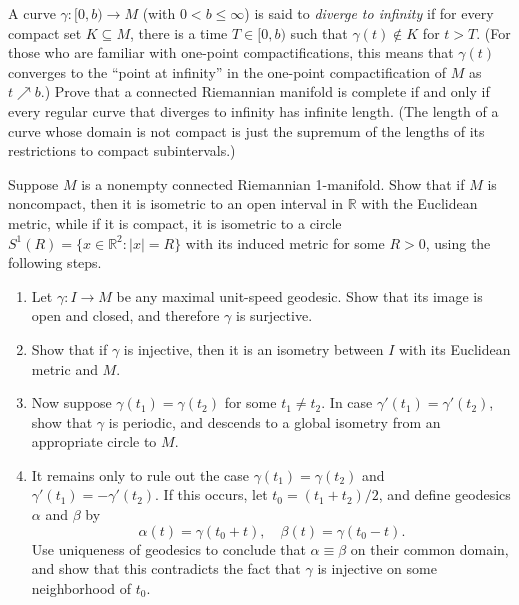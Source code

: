 \begin{exercise}
\label{prob:completeness-divergence}

A curve $\gamma : [0, b) \to M$ (with $0 < b \leq \infty$) is said to \emph{diverge to infinity} if for every compact set $K \subseteq M$, there is a time $T \in [0, b)$ such that $\gamma(t) \notin K$ for $t > T$. (For those who are familiar with one-point compactifications, this means that $\gamma(t)$ converges to the ``point at infinity'' in the one-point compactification of $M$ as $t \nearrow b$.) Prove that a connected Riemannian manifold is complete if and only if every regular curve that diverges to infinity has infinite length. (The length of a curve whose domain is not compact is just the supremum of the lengths of its restrictions to compact subintervals.)
\end{exercise}

\begin{exercise}
\label{prob:connected-riemannian-1-manifold-structure}

Suppose $M$ is a nonempty connected Riemannian 1-manifold. Show that if $M$ is noncompact, then it is isometric to an open interval in $\mathbb{R}$ with the Euclidean metric, while if it is compact, it is isometric to a circle $S^1(R) = \{x \in \mathbb{R}^2 : |x| = R\}$ with its induced metric for some $R > 0$, using the following steps.
\begin{enumerate}
\item[(a)] Let $\gamma : I \to M$ be any maximal unit-speed geodesic. Show that its image is open and closed, and therefore $\gamma$ is surjective.
\item[(b)] Show that if $\gamma$ is injective, then it is an isometry between $I$ with its Euclidean metric and $M$.
\item[(c)] Now suppose $\gamma(t_1) = \gamma(t_2)$ for some $t_1 \ne t_2$. In case $\gamma'(t_1) = \gamma'(t_2)$, show that $\gamma$ is periodic, and descends to a global isometry from an appropriate circle to $M$.
\item[(d)] It remains only to rule out the case $\gamma(t_1) = \gamma(t_2)$ and $\gamma'(t_1) = -\gamma'(t_2)$. If this occurs, let $t_0 = (t_1 + t_2)/2$, and define geodesics $\alpha$ and $\beta$ by
\[
\alpha(t) = \gamma(t_0 + t), \quad \beta(t) = \gamma(t_0 - t).
\]
Use uniqueness of geodesics to conclude that $\alpha \equiv \beta$ on their common domain, and show that this contradicts the fact that $\gamma$ is injective on some neighborhood of $t_0$.
\end{enumerate}
\end{exercise}

